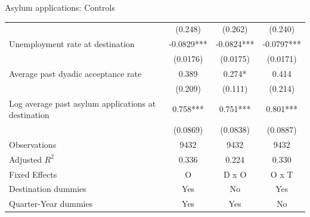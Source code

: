 \documentclass{beamer}
\begin{document}
\begin{frame}{Asylum applications: Controls}
\begin{table}
\begin{threeparttable}
\begin{tabular}{l*{3}{c}}
                                        &   (0.248)         &   (0.262)         &   (0.240)         \\
Unemployment rate at destination        &   -0.0829***&   -0.0824***&   -0.0797***\\
                                        &  (0.0176)         &  (0.0175)         &  (0.0171)         \\
Average past dyadic acceptance rate     &     0.389         &     0.274*  &     0.414         \\
                                        &   (0.209)         &   (0.111)         &   (0.214)         \\
Log average past asylum applications at destination&     0.758***&     0.751***&     0.801***\\
                                        &  (0.0869)         &  (0.0838)         &  (0.0887)         \\
\hline
Observations                            &     9432         &     9432         &     9432         \\
Adjusted \(R^{2}\)                      &     0.336         &     0.224         &     0.330         \\
Fixed Effects                           &         O         &     D x O         &     O x T         \\
Destination dummies                     &       Yes         &        No         &       Yes         \\
Quarter-Year dummies                    &       Yes         &       Yes         &        No         \\
\hline
\end{tabular}
\end{threeparttable}
\end{table}
	\end{frame}
\end{document}
